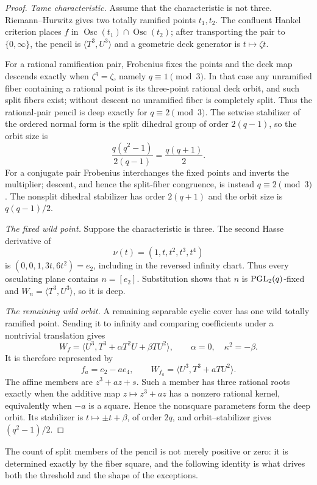 \begin{proof}
\emph{Tame characteristic.}
Assume that the characteristic is not three.  Riemann--Hurwitz
gives two totally ramified points $t_1,t_2$.  The confluent Hankel
criterion places $f$ in
$\operatorname{Osc}(t_1)\cap\operatorname{Osc}(t_2)$; after transporting
the pair to $\{0,\infty\}$, the pencil is
$\langle T^3,U^3\rangle$ and a geometric deck generator is
$t\mapsto\zeta t$.

For a rational ramification pair, Frobenius fixes the points and the
deck map descends exactly when $\zeta^q=\zeta$, namely
$q\equiv1\pmod3$.  In that case any unramified fiber containing a rational
point is its three-point rational deck orbit, and such split fibers exist;
without descent no unramified fiber is completely split.  Thus the
rational-pair pencil is deep exactly for
$q\equiv2\pmod3$.  The setwise stabilizer of the ordered normal form is
the split dihedral group of order $2(q-1)$, so the orbit size is
\[
       \frac{q(q^2-1)}{2(q-1)}=\frac{q(q+1)}2.
\]
For a conjugate pair Frobenius interchanges the fixed points and
inverts the multiplier; descent, and hence the split-fiber congruence, is
instead $q\equiv2\pmod3$.  The
nonsplit dihedral stabilizer has order $2(q+1)$ and the orbit size is
$q(q-1)/2$.

\emph{The fixed wild point.}
Suppose the characteristic is three.  The second Hasse derivative
of
\[
       \nu(t)=(1,t,t^2,t^3,t^4)
\]
is $(0,0,1,3t,6t^2)=e_2$, including in the reversed infinity chart.
Thus every osculating plane contains $n=[e_2]$.  Substitution shows that
$n$ is $\operatorname{PGL}_2(q)$-fixed and
$W_n=\langle T^3,U^3\rangle$, so it is deep.

\emph{The remaining wild orbit.}
A remaining separable cyclic cover has one wild totally ramified
point.  Sending it to infinity and comparing coefficients under a
nontrivial translation gives
\[
 W_f=\langle U^3,T^3+\alpha T^2U+\beta TU^2\rangle,\qquad
 \alpha=0,\quad \kappa^2=-\beta.
\]
It is therefore represented by
\[
 f_a=e_2-ae_4,\qquad
 W_{f_a}=\langle U^3,T^3+aTU^2\rangle.
\]
The affine members are $z^3+az+s$.  Such a member has three rational
roots exactly when the additive map $z\mapsto z^3+az$ has a nonzero
rational kernel, equivalently when $-a$ is a square.  Hence the
nonsquare parameters form the deep orbit.  Its stabilizer is
$t\mapsto\pm t+\beta$, of order $2q$, and orbit--stabilizer gives
$(q^2-1)/2$.
\end{proof}

The count of split members of the pencil is not merely positive or
zero: it is determined exactly by the fiber square, and the following
identity is what drives both the threshold and the shape of the
exceptions.

